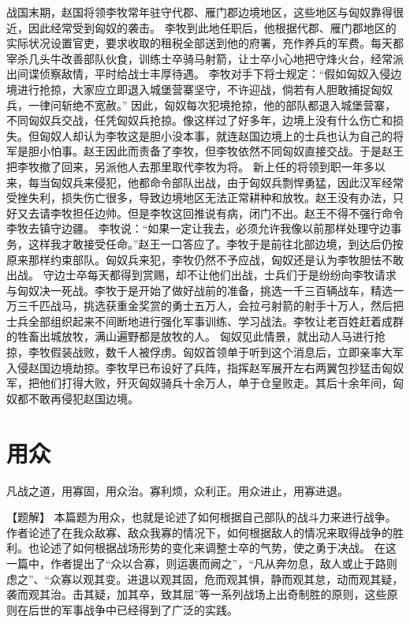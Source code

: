 \documentclass[a4paper,12pt,UTF8,twoside]{ctexbook}
\begin{document}
战国末期，赵国将领李牧常年驻守代郡、雁门郡边境地区，这些地区与匈奴靠得很近，因此经常受到匈奴的袭击。
李牧到此地任职后，他根据代郡、雁门郡地区的实际状况设置官吏，要求收取的租税全部送到他的府署，充作养兵的军费。每天都宰杀几头牛改善部队伙食，训练士卒骑马射箭，让士卒小心地把守烽火台，经常派出间谍侦察敌情，平时给战士丰厚待遇。
李牧对手下将士规定：“假如匈奴入侵边境进行抢掠，大家应立即退入城堡营寨坚守，不许迎战，倘若有人胆敢捕捉匈奴兵，一律问斩绝不宽赦。”
因此，匈奴每次犯境抢掠，他的部队都退入城堡营寨，不同匈奴兵交战，任凭匈奴兵抢掠。像这样过了好多年，边境上没有什么伤亡和损失。但匈奴人却认为李牧这是胆小没本事，就连赵国边境上的士兵也认为自己的将军是胆小怕事。赵王因此而责备了李牧，但李牧依然不同匈奴直接交战。于是赵王把李牧撤了回来，另派他人去那里取代李牧为将。
新上任的将领到职一年多以来，每当匈奴兵来侵犯，他都命令部队出战，由于匈奴兵剽悍勇猛，因此汉军经常受挫失利，损失伤亡很多，导致边境地区无法正常耕种和放牧。赵王没有办法，只好又去请李牧担任边帅。但是李牧这回推说有病，闭门不出。赵王不得不强行命令李牧去镇守边疆。
李牧说：“如果一定让我去，必须允许我像以前那样处理守边事务，这样我才敢接受任命。”赵王一口答应了。李牧于是前往北部边境，到达后仍按原来那样约束部队。匈奴兵来犯，李牧仍然不予应战，匈奴还是认为李牧胆怯不敢出战。
守边士卒每天都得到赏赐，却不让他们出战，士兵们于是纷纷向李牧请求与匈奴决一死战。李牧于是开始了做好战前的准备，挑选一千三百辆战车，精选一万三千匹战马，挑选获重金奖赏的勇士五万人，会拉弓射箭的射手十万人，然后把士兵全部组织起来不间断地进行强化军事训练、学习战法。李牧让老百姓赶着成群的牲畜出城放牧，满山遍野都是放牧的人。
匈奴见此情景，就出动人马进行抢掠，李牧假装战败，数千人被俘虏。匈奴首领单于听到这个消息后，立即亲率大军入侵赵国边境劫掠。李牧早已布设好了兵阵，指挥赵军展开左右两翼包抄猛击匈奴军，把他们打得大败，歼灭匈奴骑兵十余万人，单于仓皇败走。其后十余年间，匈奴都不敢再侵犯赵国边境。


\chapter{用众}

凡战之道，用寡固，用众治。寡利烦，众利正。用众进止，用寡进退。

【题解】
本篇题为用众，也就是论述了如何根据自己部队的战斗力来进行战争。作者论述了在我众敌寡、敌众我寡的情况下，如何根据敌人的情况来取得战争的胜利。也论述了如何根据战场形势的变化来调整士卒的气势，使之勇于决战。
在这一篇中，作者提出了“众以合寡，则运裹而阙之”，“凡从奔勿息，敌人或止于路则虑之”、“众寡以观其变。进退以观其固，危而观其惧，静而观其怠，动而观其疑，袭而观其治。击其疑，加其卒，致其屈”等一系列战场上出奇制胜的原则，这些原则在后世的军事战争中已经得到了广泛的实践。
\end{document}
